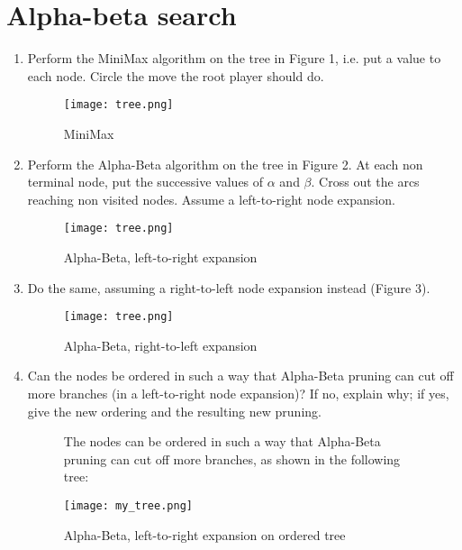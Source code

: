 \section{Alpha-beta search}

\begin{enumerate}
    \item Perform the MiniMax algorithm on the tree in Figure 1, i.e. put a value to each node. Circle the move the root player should do.
      \begin{figure}[!ht]
      \begin{framed}
	  \centering
	  \texttt{[image: tree.png]}
	  \caption{MiniMax}
      \end{framed}
      \end{figure}
      \FloatBarrier
    \item Perform the Alpha-Beta algorithm on the tree in Figure 2. At each non terminal node, put the successive values of $\alpha$ and $\beta$. Cross out the arcs reaching non visited nodes. Assume a left-to-right node expansion.
      \begin{figure}[!ht]
      \begin{framed}
	  \centering
	  \texttt{[image: tree.png]}
	  \caption{Alpha-Beta, left-to-right expansion}
      \end{framed}
      \end{figure}
      \FloatBarrier
    \item Do the same, assuming a right-to-left node expansion instead (Figure 3).
      \begin{figure}[!ht]
      \begin{framed}
	  \centering
	  \texttt{[image: tree.png]}
	  \caption{Alpha-Beta, right-to-left expansion}
      \end{framed}
      \end{figure}
      \FloatBarrier
    \item Can the nodes be ordered in such a way that Alpha-Beta pruning can cut off more branches (in a left-to-right node expansion)? If no, explain why; if yes, give the new ordering and the resulting new pruning.
      \begin{figure}[!ht]
      \begin{framed}
        The nodes can be ordered in such a way that Alpha-Beta pruning can
        cut off more branches, as shown in the following tree:

        \bigskip
        \bigskip
	  \centering
	  \texttt{[image: my\_tree.png]}
      \bigskip
      \bigskip
	  \caption{Alpha-Beta, left-to-right expansion on ordered tree}
      \end{framed}
      \end{figure}
      \FloatBarrier
\end{enumerate}

